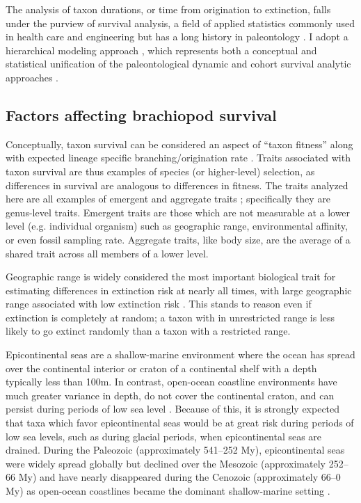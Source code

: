 \documentclass{article}
\begin{document}
The analysis of taxon durations, or time from origination to extinction, falls under the purview of survival analysis, a field of applied statistics commonly used in health care and engineering \citep{Klein2003} but has a long history in paleontology \citep{Simpson1944,Simpson1953,VanValen1973,VanValen1979,Smits2015,Crampton2016}. I adopt a hierarchical modeling approach \citep{Gelman2007,Gelman2013d,Klein2003}, which represents both a conceptual and statistical unification of the paleontological dynamic and cohort survival analytic approaches \citep{VanValen1973,VanValen1979,Raup1978,Raup1975,Foote1988,Baumiller1993,Simpson2006,Smits2015,Crampton2016,Ezard2012b}. 

\subsection{Factors affecting brachiopod survival}

Conceptually, taxon survival can be considered an aspect of ``taxon fitness'' along with expected lineage specific branching/origination rate \citep{Cooper1984,Palmer2012}. Traits associated with taxon survival are thus examples of species (or higher-level) selection, as differences in survival are analogous to differences in fitness. The traits analyzed here are all examples of emergent and aggregate traits \citep{Jablonski2008a,Rabosky2010b}; specifically they are genus-level traits. Emergent traits are those which are not measurable at a lower level (e.g. individual organism) such as geographic range, environmental affinity, or even fossil sampling rate. Aggregate traits, like body size, are the average of a shared trait across all members of a lower level.

Geographic range is widely considered the most important biological trait for estimating differences in extinction risk at nearly all times, with large geographic range associated with low extinction risk \citep{Jablonski1986,Jablonski1987,Jablonski2003,Payne2007,Jablonski2008a,Harnik2013,Finnegan2012a}. This stands to reason even if extinction is completely at random; a taxon with in unrestricted range is less likely to go extinct randomly than a taxon with a restricted range. %

Epicontinental seas are a shallow-marine environment where the ocean has spread over the continental interior or craton of a continental shelf with a depth typically less than 100m. In contrast, open-ocean coastline environments have much greater variance in depth, do not cover the continental craton, and can persist during periods of low sea level \citep{Miller2009a}. Because of this, it is strongly expected that taxa which favor epicontinental seas would be at great risk during periods of low sea levels, such as during glacial periods, when epicontinental seas are drained. During the Paleozoic (approximately 541--252 My), epicontinental seas were widely spread globally but declined over the Mesozoic (approximately 252--66 My) and have nearly disappeared during the Cenozoic (approximately 66--0 My) as open-ocean coastlines became the dominant shallow-marine setting \citep{Peters2008,Miller2009a,Johnson1974}. 
\end{document}
